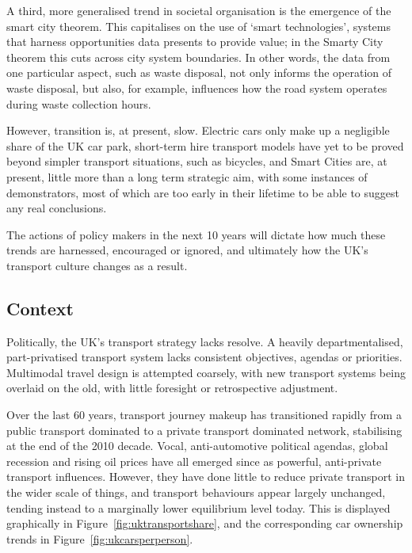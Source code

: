 \documentclass[conference]{IEEEtran}
\begin{document}
A third, more generalised trend in societal organisation is the
emergence of the smart city theorem. This capitalises on the use of
`smart technologies', systems that harness opportunities data presents
to provide value; in the Smarty City theorem this cuts across city
system boundaries. In other words, the data from one particular
aspect, such as waste disposal, not only informs the operation of
waste disposal, but also, for example, influences how the road system
operates during waste collection hours.

However, transition is, at present, slow. Electric cars only make up a
negligible share of the UK car park, short-term hire transport models
have yet to be proved beyond simpler transport situations, such as
bicycles, and Smart Cities are, at present, little more than a long
term strategic aim, with some instances of demonstrators, most of
which are too early in their lifetime to be able to suggest any real
conclusions. 

The actions of policy makers in the next 10 years will dictate
how much these trends are harnessed, encouraged or ignored, and
ultimately how the UK's transport culture changes as a result.

\subsection{Context}

Politically, the UK’s transport strategy lacks resolve. A heavily
departmentalised, part-privatised transport system lacks consistent
objectives, agendas or priorities. Multimodal travel design is
attempted coarsely, with new transport systems being overlaid on the
old, with little foresight or retrospective adjustment.

Over the last 60 years, transport journey makeup has transitioned
rapidly from a public transport dominated to a private transport
dominated network, stabilising at the end of the 2010 decade. Vocal,
anti-automotive political agendas, global recession and rising oil
prices have all emerged since as powerful, anti-private transport
influences. However, they have done little to reduce private transport
in the wider scale of things, and transport behaviours appear largely
unchanged, tending instead to a marginally lower equilibrium level
today. This is displayed graphically in
Figure~\ref{fig:uktransportshare}, and the corresponding car ownership
trends in Figure~\ref{fig:ukcarsperperson}.
\end{document}
